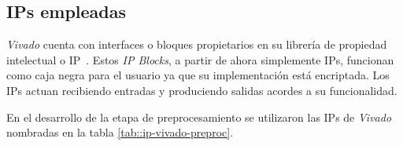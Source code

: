 \documentclass[../../main.tex]{subfiles}
\begin{document}

\subsection{IPs empleadas}
\textit{Vivado} cuenta con interfaces o bloques propietarios en su librería de propiedad intelectual o IP~\cite{IP-Xilinx}. Estos \textit{IP Blocks}, a partir de ahora simplemente IPs, funcionan como caja negra para el usuario ya que su implementación está encriptada. Los IPs actuan recibiendo entradas y produciendo salidas acordes a su funcionalidad.

En el desarrollo de la etapa de preprocesamiento se utilizaron las IPs de \textit{Vivado} nombradas en la tabla \ref{tab::ip-vivado-preproc}.
\end{document}
